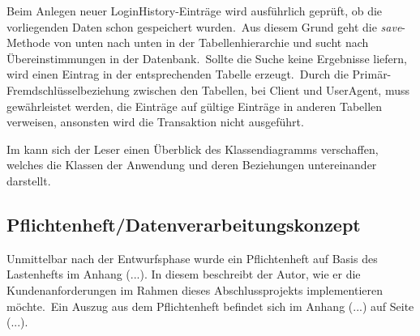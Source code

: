 Beim Anlegen neuer LoginHistory-Einträge wird ausführlich geprüft, ob die vorliegenden Daten schon gespeichert wurden.\ Aus diesem Grund geht die \textit{save}-Methode von unten nach unten in der Tabellenhierarchie und sucht nach Übereinstimmungen in der Datenbank.\ Sollte die Suche
keine Ergebnisse liefern, wird einen Eintrag in der entsprechenden Tabelle erzeugt.\ Durch die Primär-Fremdschlüsselbeziehung zwischen den Tabellen, \zB bei Client und UserAgent, muss gewährleistet werden, die Einträge auf gültige Einträge in anderen Tabellen verweisen, ansonsten wird
die Transaktion nicht ausgeführt.

Im  kann sich der Leser einen Überblick des Klassendiagramms verschaffen, welches die Klassen der Anwendung und deren Beziehungen untereinander darstellt.


\subsection{Pflichtenheft/Datenverarbeitungskonzept}
\label{subsec:Pflichtenheft}

Unmittelbar nach der Entwurfsphase wurde ein Pflichtenheft auf Basis des Lastenhefts im Anhang (...). In diesem beschreibt der Autor, wie er die Kundenanforderungen im Rahmen dieses Abschlussprojekts implementieren möchte.\ Ein Auszug aus dem Pflichtenheft befindet sich im Anhang
(...) auf Seite (...).

%


